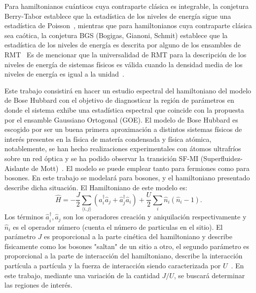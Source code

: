 \documentclass[spanish,titlepage,table]{practicas}
\begin{document}
Para hamiltonianos cuánticos cuya contraparte clásica es integrable, la conjetura Berry-Tabor establece que 
la estadística de los niveles de energía sigue una estadística de Poisson~\cite{BerryTabor1977}, mientras que para hamiltonianos 
cuya contraparte clásica sea caótica, la conjetura BGS (Bogigas, Gianoni, Schmit) establece que la estadística de los niveles de energía es descrita 
por alguno de los ensambles de RMT~\cite{Atas_2013}
Es de mencionar que la universalidad de RMT para la descripción de los niveles de energía de sistemas físicos 
es válida cuando la densidad media de los niveles de energía es igual a la unidad~\cite{Atas_2013}.


Este trabajo consistirá en hacer un estudio espectral del hamiltoniano del modelo de Bose Hubbard 
con el objetivo de diagnosticar la región de parámetros en donde el sistema exhibe una estadística espectral 
que coincide con la propuesta por el ensamble Gaussiano Ortogonal (GOE). El modelo de Bose Hubbard es escogido por ser un buena primera aproximación a distintos sistemas físicos de interés presentes en la física de matería condensada y física atómica, notablemente, 
se han hecho realizaciones experimentales con átomos ultrafríos sobre un red óptica y se ha podido observar la transición SF-MI (Superfluidez-Aislante de Mott)~\cite{Zhang2010}. 
El modelo se puede emplear tanto para fermiones como para bosones. En este trabajo se modelará para bosones, y el hamiltoniano presentado describe dicha situación. El Hamiltoniano de este modelo es:
\begin{equation}
\hat{H}
= -\frac{J}{2} \sum_{\langle i,j\rangle} \!\left(\hat{a}_i^{\dagger}\hat{a}_j + \hat{a}_j^{\dagger}\hat{a}_i\right)
+ \frac{U}{2}\sum_{i}\hat{n}_i(\hat{n}_i - 1).
\end{equation}
Los términos $\hat{a}_i^{\dagger},\hat{a}_j$ son los operadores creación y aniquilación respectivamente y $\hat{n}_i$ es el operador número (cuenta el número de particulas en el sitio).
El parámetro $J$ es proporcional a la parte cinética del hamiltoniano y describe físicamente como los bosones "saltan" de un sitio a otro, el segundo parámetro es proporcional a la parte de interacción del hamiltoniano, describe 
la interacción partícula a partícula y la fuerza de interacción siendo caracterizada por $U$~\cite{Zhang2010}. 
En este trabajo, mediante una variación de la cantidad $J/U$, se buscará determinar las regiones de interés.
\end{document}
